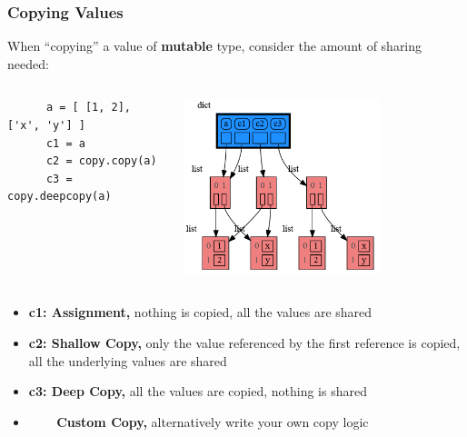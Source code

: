 \documentclass[10pt, colorlinks=true, urlcolor=blue]{beamer}
\begin{document}
\begin{frame}[fragile]
  \frametitle{Copying Values}
  When ``copying'' a value of \textbf{mutable} type, consider the amount of sharing needed:
  \vspace{-1em}
\begin{columns}
  \begin{verbatim}
      a = [ [1, 2], ['x', 'y'] ]
      c1 = a
      c2 = copy.copy(a)
      c3 = copy.deepcopy(a)
    \end{verbatim}
    \begin{center}\includegraphics[width=0.7\textwidth]{figures/copy.png}\end{center}
\end{columns}
    \begin{itemize}
        \item \textbf{c1: Assignment,} nothing is copied, all the values are shared
        \item \textbf{c2: Shallow Copy,} only the value referenced by the first reference is copied, all the underlying values are shared
        \item \textbf{c3: Deep Copy,} all the values are copied, nothing is shared
        \item \ \ \, \,\, \textbf{Custom Copy,} alternatively write your own copy logic
    \end{itemize}
\end{frame}
\end{document}

